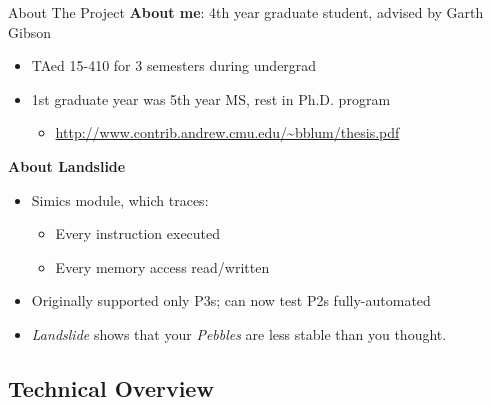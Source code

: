 \documentclass[xcolor=dvipsnames]{beamer}
\begin{document}
\begin{frame}{About The Project}
	\textbf{About me}: 4th year graduate student, advised by Garth Gibson
	\begin{itemize}
		\item TAed 15-410 for 3 semesters during undergrad
		\item 1st graduate year was 5th year MS, rest in Ph.D. program
		\begin{itemize}
			\item \url{http://www.contrib.andrew.cmu.edu/~bblum/thesis.pdf}
		\end{itemize}
	\end{itemize}
	\pause
	\linegap

	{\bf About Landslide}
	\begin{itemize}
		\item Simics module, which traces:
			\begin{itemize}
				\item Every instruction executed
				\item Every memory access read/written
			\end{itemize}
		\item Originally supported only P3s; can now test P2s fully-automated
		\item {\em Landslide} shows that your {\em Pebbles} are less stable than you thought.
	\end{itemize}
\end{frame}


\subsection{Technical Overview}
\end{document}
